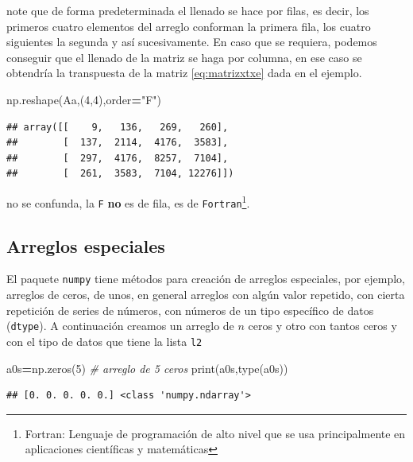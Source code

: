 \documentclass[
]{book}
\newenvironment{Shaded}{\begin{snugshade}}{\end{snugshade}}
\newcommand{\BuiltInTok}[1]{#1}
\newcommand{\CommentTok}[1]{\textcolor[rgb]{0.56,0.35,0.01}{\textit{#1}}}
\newcommand{\DecValTok}[1]{\textcolor[rgb]{0.00,0.00,0.81}{#1}}
\newcommand{\NormalTok}[1]{#1}
\newcommand{\OperatorTok}[1]{\textcolor[rgb]{0.81,0.36,0.00}{\textbf{#1}}}
\newcommand{\StringTok}[1]{\textcolor[rgb]{0.31,0.60,0.02}{#1}}
\theoremstyle{definition}
\theoremstyle{definition}
\theoremstyle{definition}
\theoremstyle{definition}
\theoremstyle{remark}
\begin{document}
note que de forma predeterminada el llenado se hace por filas, es decir, los primeros cuatro elementos del arreglo conforman la primera fila, los cuatro siguientes la segunda y así sucesivamente. En caso que se requiera, podemos conseguir que el llenado de la matriz se haga por columna, en ese caso se obtendría la transpuesta de la matriz \eqref{eq:matrizxtxe} dada en el ejemplo.

\begin{Shaded}
\begin{Highlighting}[]
\NormalTok{np.reshape(Aa,(}\DecValTok{4}\NormalTok{,}\DecValTok{4}\NormalTok{),order}\OperatorTok{=}\StringTok{"F"}\NormalTok{) }
\end{Highlighting}
\end{Shaded}

\begin{verbatim}
## array([[    9,   136,   269,   260],
##        [  137,  2114,  4176,  3583],
##        [  297,  4176,  8257,  7104],
##        [  261,  3583,  7104, 12276]])
\end{verbatim}

no se confunda, la \texttt{F} \textbf{no} es de fila, es de \texttt{Fortran}\footnote{Fortran: Lenguaje de programación de alto nivel que se usa principalmente en aplicaciones científicas y matemáticas}.

\hypertarget{arreglos-especiales}{%
\subsection{Arreglos especiales}\label{arreglos-especiales}}

El paquete \texttt{numpy} tiene métodos para creación de arreglos especiales, por ejemplo, arreglos de ceros, de unos, en general arreglos con algún valor repetido, con cierta repetición de series de números, con números de un tipo específico de datos (\texttt{dtype}). A continuación creamos un arreglo de \(n\) ceros y otro con tantos ceros y con el tipo de datos que tiene la lista \texttt{l2}

\begin{Shaded}
\begin{Highlighting}[]
\NormalTok{a0s}\OperatorTok{=}\NormalTok{np.zeros(}\DecValTok{5}\NormalTok{) }\CommentTok{\# arreglo de 5 ceros }
\BuiltInTok{print}\NormalTok{(a0s,}\BuiltInTok{type}\NormalTok{(a0s))}
\end{Highlighting}
\end{Shaded}

\begin{verbatim}
## [0. 0. 0. 0. 0.] <class 'numpy.ndarray'>
\end{verbatim}
\end{document}
